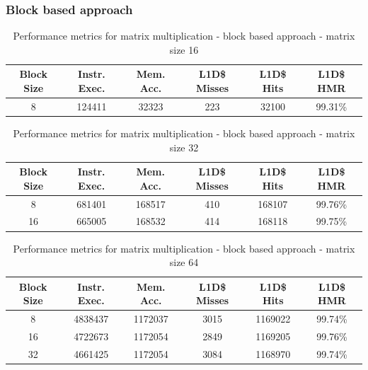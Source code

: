 \subsubsection{Block based approach}

\begin{center}
\begin{table}[!htbp]
\centering
\begin{tabular}{|c|c|c|c|c|c|}
\hline
\textbf{Block Size} & \textbf{Instr. Exec.} & \textbf{Mem. Acc.} & \textbf{L1D\$ Misses} & \textbf{L1D\$ Hits} & \textbf{L1D\$ HMR} \\ \hline
8 & 124411 & 32323 & 223 & 32100 & 99.31\% \\ \hline
\end{tabular}
\caption{Performance metrics for matrix multiplication - block based approach - matrix size 16}
\label{tab:performance_metrics_16}
\end{table}
\end{center}

\begin{center}
\begin{table}[!htbp]
\centering
\begin{tabular}{|c|c|c|c|c|c|}
\hline
\textbf{Block Size} & \textbf{Instr. Exec.} & \textbf{Mem. Acc.} & \textbf{L1D\$ Misses} & \textbf{L1D\$ Hits} & \textbf{L1D\$ HMR} \\ \hline
8 & 681401 & 168517 & 410 & 168107 & 99.76\% \\ \hline
16 & 665005 & 168532 & 414 & 168118 & 99.75\% \\ \hline
\end{tabular}
\caption{Performance metrics for matrix multiplication - block based approach - matrix size 32}
\label{tab:performance_metrics_32}
\end{table}
\end{center}

\begin{center}
\begin{table}[!htbp]
\centering
\begin{tabular}{|c|c|c|c|c|c|}
\hline
\textbf{Block Size} & \textbf{Instr. Exec.} & \textbf{Mem. Acc.} & \textbf{L1D\$ Misses} & \textbf{L1D\$ Hits} & \textbf{L1D\$ HMR} \\ \hline
8 & 4838437 & 1172037 & 3015 & 1169022 & 99.74\% \\ \hline
16 & 4722673 & 1172054 & 2849 & 1169205 & 99.76\% \\ \hline
32 & 4661425 & 1172054 & 3084 & 1168970 & 99.74\% \\ \hline
\end{tabular}
\caption{Performance metrics for matrix multiplication - block based approach - matrix size 64}
\label{tab:performance_metrics_64}
\end{table}
\end{center}

